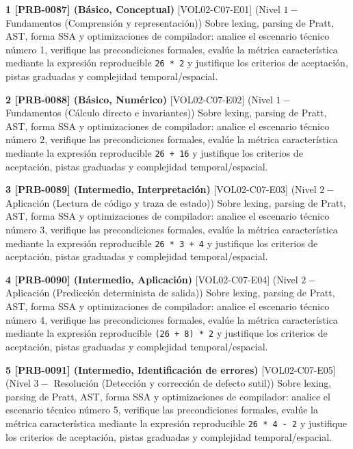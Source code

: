 \documentclass{book}
\begin{document}
\begin{tcolorbox}[title={Ejercicios}, studiumworked, breakable]

\noindent\textbf{1 [PRB-0087] (Básico, Conceptual)}
[VOL02-C07-E01] (Nivel \(1 -\) Fundamentos (Comprensión y representación)) Sobre lexing, parsing de Pratt, AST, forma SSA y optimizaciones de compilador: analice el escenario técnico número 1, verifique las precondiciones formales, evalúe la métrica característica mediante la expresión reproducible \texttt{26 * 2} y justifique los criterios de aceptación, pistas graduadas y complejidad temporal/espacial.

\noindent\textbf{2 [PRB-0088] (Básico, Numérico)}
[VOL02-C07-E02] (Nivel \(1 -\) Fundamentos (Cálculo directo e invariantes)) Sobre lexing, parsing de Pratt, AST, forma SSA y optimizaciones de compilador: analice el escenario técnico número 2, verifique las precondiciones formales, evalúe la métrica característica mediante la expresión reproducible \texttt{26 + 16} y justifique los criterios de aceptación, pistas graduadas y complejidad temporal/espacial.

\noindent\textbf{3 [PRB-0089] (Intermedio, Interpretación)}
[VOL02-C07-E03] (Nivel \(2 -\) Aplicación (Lectura de código y traza de estado)) Sobre lexing, parsing de Pratt, AST, forma SSA y optimizaciones de compilador: analice el escenario técnico número 3, verifique las precondiciones formales, evalúe la métrica característica mediante la expresión reproducible \texttt{26 * 3 + 4} y justifique los criterios de aceptación, pistas graduadas y complejidad temporal/espacial.

\noindent\textbf{4 [PRB-0090] (Intermedio, Aplicación)}
[VOL02-C07-E04] (Nivel \(2 -\) Aplicación (Predicción determinista de salida)) Sobre lexing, parsing de Pratt, AST, forma SSA y optimizaciones de compilador: analice el escenario técnico número 4, verifique las precondiciones formales, evalúe la métrica característica mediante la expresión reproducible \texttt{(26 + 8) * 2} y justifique los criterios de aceptación, pistas graduadas y complejidad temporal/espacial.

\noindent\textbf{5 [PRB-0091] (Intermedio, Identificación de errores)}
[VOL02-C07-E05] (Nivel \(3 -\) Resolución (Detección y corrección de defecto sutil)) Sobre lexing, parsing de Pratt, AST, forma SSA y optimizaciones de compilador: analice el escenario técnico número 5, verifique las precondiciones formales, evalúe la métrica característica mediante la expresión reproducible \texttt{26 * 4 - 2} y justifique los criterios de aceptación, pistas graduadas y complejidad temporal/espacial.


\end{tcolorbox}
\end{document}
